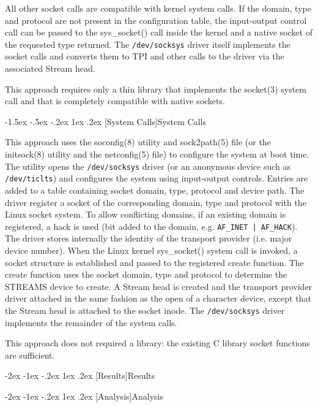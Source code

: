 \documentclass[letterpaper,final,notitlepage,twocolumn,10pt,twoside]{article}
\makeatletter
\renewcommand\section{\@startsection {section}{1}{\z@}%
                                   {-2ex \@plus -1ex \@minus -.2ex}%
                                   {1ex \@plus .2ex}%
                                   {\normalfont\large\bfseries}}
\renewcommand\subsection{\@startsection{subsection}{2}{\z@}%
                                     {-1.5ex \@plus -.5ex \@minus -.2ex}%
                                     {1ex \@plus .2ex}%
                                     {\normalfont\normalsize\bfseries}}
\makeatother
\begin{document}
All other socket calls are compatible with kernel system calls.  If the
domain, type and protocol are not present in the configuration table, the
input-output control call can be passed to the sys\_socket() call inside the
kernel and a native socket of the requested type returned.  The
\texttt{/dev/socksys} driver itself implements the socket calls and converts
them to TPI and other calls to the driver via the associated Stream head.

This approach requires only a thin library that implements the socket(3)
system call and that is completely compatible with native sockets.

\subsection[System Calls]{System Calls}

This approach uses the soconfig(8) utility and sock2path(5) file (or the
initsock(8) utility and the netconfig(5) file) to configure the system at boot
time.  The utility opens the \texttt{/dev/socksys} driver (or an anonymous
device such as \texttt{/dev/ticlts}) and configures the system using
input-output controls.  Entries are added to a table containing socket domain,
type, protocol and device path.  The driver register a socket of the
corresponding domain, type and protocol with the Linux socket system.  To
allow conflicting domains, if an existing domain is registered, a hack is used
(bit added to the domain, e.g. \texttt{AF\_INET | AF\_HACK}).  The driver
stores internally the identity of the transport provider (i.e. major device
number).  When the Linux kernel sys\_socket() system call is invoked, a socket
structure is established and passed to the registered create function.  The
create function uses the socket domain, type and protocol to determine the
STREAMS device to create.  A Stream head is created and the transport provider
driver attached in the same fashion as the open of a character device, except
that the Stream head is attached to the socket inode.  The
\texttt{/dev/socksys} driver implements the remainder of the system calls.

This approach does not required a library: the existing C library socket
functions are sufficient.

\section[Results]{Results}

\section[Analysis]{Analysis}
\end{document}
